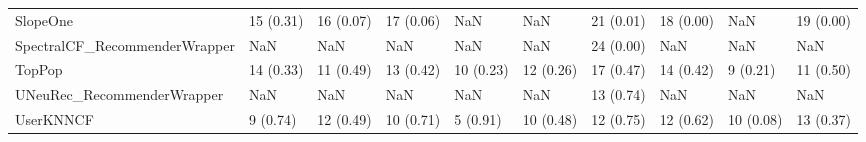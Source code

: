 \begin{tabular}{llllllllll}
                           SlopeOne &                15 (0.31) &   16 (0.07) &     17 (0.06) &          NaN &                  NaN &           21 (0.01) &         18 (0.00) &                NaN &         19 (0.00) \\
      SpectralCF\_RecommenderWrapper &                      NaN &         NaN &           NaN &          NaN &                  NaN &           24 (0.00) &               NaN &                NaN &               NaN \\
                             TopPop &                14 (0.33) &   11 (0.49) &     13 (0.42) &    10 (0.23) &            12 (0.26) &           17 (0.47) &         14 (0.42) &           9 (0.21) &         11 (0.50) \\
         UNeuRec\_RecommenderWrapper &                      NaN &         NaN &           NaN &          NaN &                  NaN &           13 (0.74) &               NaN &                NaN &               NaN \\
                          UserKNNCF &                 9 (0.74) &   12 (0.49) &     10 (0.71) &     5 (0.91) &            10 (0.48) &           12 (0.75) &         12 (0.62) &          10 (0.08) &         13 (0.37) \\
\bottomrule
\end{tabular}

